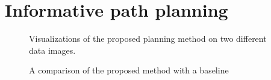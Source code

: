\section{Informative path planning}

\begin{figure}[h]
    \hfill
    \caption{Visualizations of the proposed planning method on two different data images.}
    \label{fig:res_unpairqual}
\end{figure}


\begin{figure}[h]
    \hfill
    \caption{A comparison of the proposed method with a baseline}
    \label{fig:res_pairedqual}
\end{figure}

